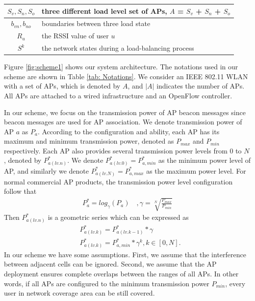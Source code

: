 \begin{table}[tbp]
\begin{center}
\begin{tabularx}{\linewidth}{| c | X | }
            \hline $S_v, S_n, S_o$  & three different load level set of APs, $A$ = $S_v$ + $S_n$ + $S_o$ \\ 
            \hline $b_{vn}, b_{no}$ & boundaries between three load state \\ 
            \hline $R_u$            & the RSSI value of user $u$ \\
            \hline $S^k$            & the network states during a load-balancing process\\
            \hline 
        \end{tabularx} 
    \end{center} 
\end{table}

Figure \ref{fig:scheme1} shows our system architecture. 
The notations used in our scheme are shown in Table \ref{tab: Notations}. 
We consider an IEEE 802.11 WLAN with a set of APs, which is denoted by $A$, and $|A|$ indicates the number of APs. 
All APs are attached to a wired infrastructure and an OpenFlow controller. 

In our scheme, we focus on the transmission power of AP beacon messages since beacon messages are used for AP association.
We denote transmission power of AP $a$ as $P_a$.
According to the configuration and ability, each AP has its maximum and minimum transmission power, denoted as $P_{max}$ and $P_{min}$ respectively. 
Each AP also provides several transmission power levels from $0$ to $N$, denoted by $P_{a(lv.n)}^*$. 
We denote $P_{a(lv.0)}^*=P_{a, min}^*$ as the minimum power level of AP, and similarly we denote $P_{a(lv.N)}^*=P_{a, max}^*$ as the maximum power level.
For normal commercial AP products, the transmission power level configuration follow that
\begin{eqnarray}
{P_a^*}=log _\gamma\left({P_a} \right)  \quad,\gamma=\sqrt[N]{\frac{P_{max}}{P_{min}}}
\end{eqnarray}
Then $P_{a(lv.n)}^*$ is a geometric series which can be expressed as
\begin{align}
&P_{a(lv.k)}^*={P_{a(lv.k-1)}^*}*\gamma\\										
&P_{a(lv.k)}^*={P_{a, min}^*}*{\gamma^k}, k\in[0, N].							
\end{align}
In our scheme we have some assumptions. First, we assume that the interference between adjacent cells can be ignored. Second, we assume that the AP deployment ensures complete overlaps between the ranges of all APs. In other words, if all APs are configured to the minimum transmission power $P_{min}$, every user in network coverage area can be still covered.

